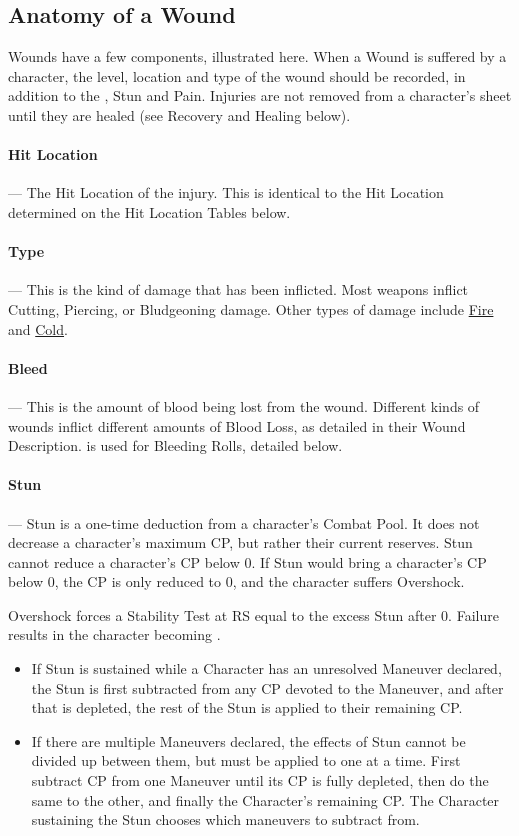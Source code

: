 \documentclass[oneside,11pt,english]{book}
\begin{document}
\subsection{Anatomy of a Wound}
Wounds have a few components, illustrated here. When a Wound is suffered by a character, the level, location and type of the wound should be recorded, in addition to the , Stun and Pain. 
Injuries are not removed from a character’s sheet until they are healed (see Recovery and Healing below).

\paragraph{Hit Location}---\quad
The Hit Location of the injury. This is identical to the Hit Location determined on the Hit Location Tables below.

\paragraph{Type}---\quad
This is the kind of damage that has been inflicted. Most weapons inflict Cutting, Piercing, or Bludgeoning damage. Other types of damage include \hyperref[wound:Burn Damage]{Fire} and \hyperref[wound:Cold Damage]{Cold}.
\paragraph{Bleed\label{par:Bleed}}---\quad
This is the amount of blood being lost from the wound. Different kinds of wounds inflict different amounts of Blood Loss, as detailed in their Wound Description.  is used for Bleeding Rolls, detailed below. 

\paragraph{Stun\label{par:Stun}}---\quad
Stun is a one-time deduction from a character's Combat Pool. It does not decrease a character's maximum CP, but rather their current reserves. Stun cannot reduce a character's CP below 0. If Stun would bring a character's CP below 0, the CP is only reduced to 0, and the character suffers Overshock.

\label{par:Overshock}Overshock forces a Stability Test at RS equal to the excess Stun after 0. Failure results in the character becoming . %

\begin{itemize}
\item If Stun is sustained while a Character has an unresolved Maneuver declared, the Stun is first 
  subtracted from any CP devoted to the Maneuver, and after that is depleted, the rest of the Stun is 
  applied to their remaining CP. 
\item If there are multiple Maneuvers declared, the effects of Stun cannot be divided up between them, 
  but must be applied to one at a time. First subtract CP from one Maneuver until its CP is fully 
  depleted, then do the same to the other, and finally the Character’s remaining CP. The Character 
  sustaining the Stun chooses which maneuvers to subtract from. 
\end{itemize}
\end{document}
